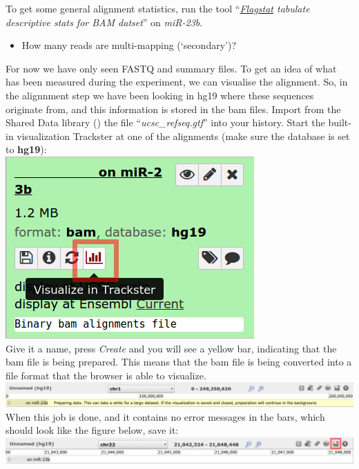 To get some general alignment statistics, run the tool ``\textit{\underline{Flagstat} tabulate descriptive stats for BAM datset}'' on \textit{miR-23b}.
\begin{itemize}
	\item How many reads are multi-mapping (`secondary')?
\end{itemize}
For now we have only seen FASTQ and summary files. To get an idea of what has been measured during the experiment, we can visualise the alignment. So, in the alignnment step we have been looking in hg19 where these sequences originate from, and this information is stored in the bam files. Import from the Shared Data library (\datalibrarydirrnaseqadvanced) the file ``\textit{ucsc\_refseq.gtf}'' into your history. Start the built-in visualization Trackster at one of the alignments (make sure the database is set to \textbf{hg19}):\\
\includegraphics[scale=0.55]{figures/alignment_03}\\
Give it a name, press \textit{Create} and you will see a yellow bar, indicating that the bam file is being prepared. This means that the bam file is being converted into a file format that the browser is able to visualize.\\
\includegraphics[width=\textwidth]{figures/alignment_04.png}\\
When this job is done, and it contains no error messages in the bars, which should look like the figure below, save it:\\
\includegraphics[width=\textwidth]{figures/alignment_05.png}\\
